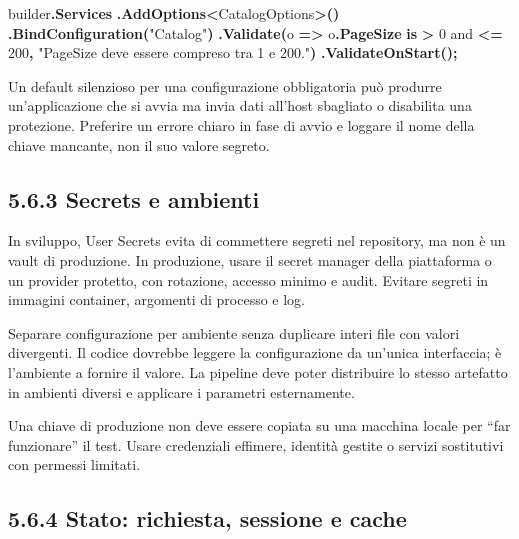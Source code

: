 \documentclass[
  italian,
  10pt,
]{book}
\newenvironment{Shaded}{\begin{snugshade}}{\end{snugshade}}
\newcommand{\DecValTok}[1]{\textcolor[rgb]{0.00,0.00,0.81}{#1}}
\newcommand{\FunctionTok}[1]{\textcolor[rgb]{0.13,0.29,0.53}{\textbf{#1}}}
\newcommand{\KeywordTok}[1]{\textcolor[rgb]{0.13,0.29,0.53}{\textbf{#1}}}
\newcommand{\NormalTok}[1]{#1}
\newcommand{\OperatorTok}[1]{\textcolor[rgb]{0.81,0.36,0.00}{\textbf{#1}}}
\newcommand{\StringTok}[1]{\textcolor[rgb]{0.31,0.60,0.02}{#1}}
\begin{document}
\begin{Shaded}
\begin{Highlighting}[]
\NormalTok{builder}\OperatorTok{.}\FunctionTok{Services}
    \OperatorTok{.}\FunctionTok{AddOptions}\OperatorTok{\textless{}}\NormalTok{CatalogOptions}\OperatorTok{\textgreater{}()}
    \OperatorTok{.}\FunctionTok{BindConfiguration}\OperatorTok{(}\StringTok{"Catalog"}\OperatorTok{)}
    \OperatorTok{.}\FunctionTok{Validate}\OperatorTok{(}\NormalTok{o }\OperatorTok{=\textgreater{}}\NormalTok{ o}\OperatorTok{.}\FunctionTok{PageSize} \KeywordTok{is} \OperatorTok{\textgreater{}} \DecValTok{0}\NormalTok{ and }\OperatorTok{\textless{}=} \DecValTok{200}\OperatorTok{,}
        \StringTok{"PageSize deve essere compreso tra 1 e 200."}\OperatorTok{)}
    \OperatorTok{.}\FunctionTok{ValidateOnStart}\OperatorTok{();}
\end{Highlighting}
\end{Shaded}

Un default silenzioso per una configurazione obbligatoria può produrre
un'applicazione che si avvia ma invia dati all'host sbagliato o
disabilita una protezione. Preferire un errore chiaro in fase di avvio e
loggare il nome della chiave mancante, non il suo valore segreto.

\subsection{5.6.3 Secrets e ambienti}\label{secrets-e-ambienti}

In sviluppo, User Secrets evita di commettere segreti nel repository, ma
non è un vault di produzione. In produzione, usare il secret manager
della piattaforma o un provider protetto, con rotazione, accesso minimo
e audit. Evitare segreti in immagini container, argomenti di processo e
log.

Separare configurazione per ambiente senza duplicare interi file con
valori divergenti. Il codice dovrebbe leggere la configurazione da
un'unica interfaccia; è l'ambiente a fornire il valore. La pipeline deve
poter distribuire lo stesso artefatto in ambienti diversi e applicare i
parametri esternamente.

Una chiave di produzione non deve essere copiata su una macchina locale
per ``far funzionare'' il test. Usare credenziali effimere, identità
gestite o servizi sostitutivi con permessi limitati.

\subsection{5.6.4 Stato: richiesta, sessione e
cache}\label{stato-richiesta-sessione-e-cache}
\end{document}
